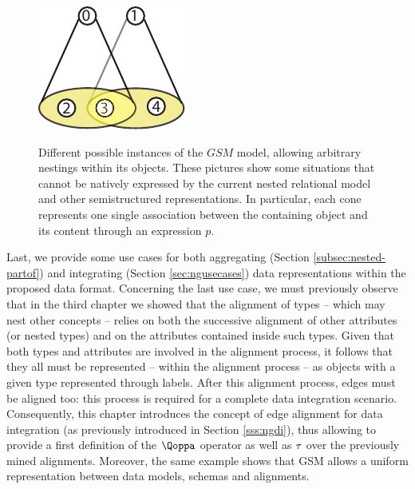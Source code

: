 \begin{figure}
	\begin{minipage}{.45\textwidth}
		\centering
		\includegraphics{fig/04model/03Overlapping}
		\label{fig:03overlapping}
	\end{minipage}
	\caption{Different possible instances of the $GSM$ model, allowing arbitrary nestings within its objects. These pictures show some situations that cannot be natively expressed by the current nested relational model and other semistructured representations. In particular, each cone represents one single association between the containing object and its content through an expression $p$.}
\end{figure}
Last, we provide some use cases for both aggregating (Section \ref{subsec:nested-partof}) and integrating (Section \ref{sec:ngusecases}) data representations within the proposed data format. Concerning the last use case, we must previously observe that in the third chapter  we  showed that the alignment of types -- which may nest other concepts -- relies on both the successive alignment of other attributes (or nested types) and on the attributes contained inside such types. Given that both types and attributes are involved in the alignment process, it follows that they all must be represented -- within the alignment process -- as objects with a given type represented through labels. 
After this alignment process, edges must be aligned too: this process is required for a complete data integration scenario. Consequently, this chapter introduces the concept of edge alignment for data integration (as previously introduced in Section \vref{sss:ngdi}), thus allowing to provide a first definition of the $\qtransl$ operator as well as $\ttransl$ over the previously mined alignments. Moreover, the same example shows that GSM allows a uniform representation between data models, schemas and alignments.

